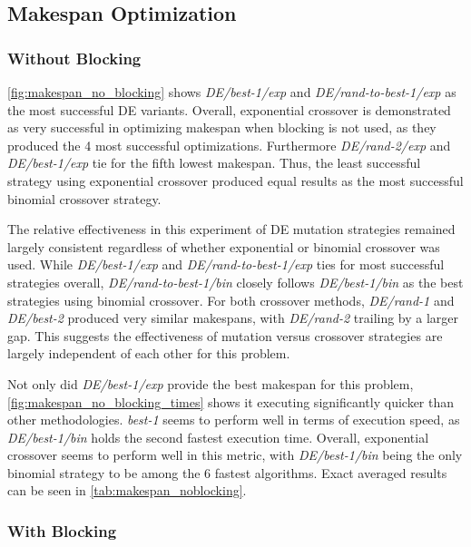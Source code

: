 \documentclass{article}
\begin{document}
\subsection{Makespan Optimization}
\subsubsection{Without Blocking}

\cref{fig:makespan_no_blocking} shows \textit{DE/best-1/exp} and \textit{DE/rand-to-best-1/exp} as the most successful DE variants. Overall, exponential crossover is demonstrated as very successful in optimizing makespan when blocking is not used, as they produced the 4 most successful optimizations. Furthermore \textit{DE/rand-2/exp} and \textit{DE/best-1/exp} tie for the fifth lowest makespan. Thus, the least successful strategy using exponential crossover produced equal results as the most successful binomial crossover strategy. 

The relative effectiveness in this experiment of DE mutation strategies remained largely consistent regardless of whether exponential or binomial crossover was used. While \textit{DE/best-1/exp} and \textit{DE/rand-to-best-1/exp} ties for most successful strategies overall, \textit{DE/rand-to-best-1/bin} closely follows \textit{DE/best-1/bin} as the best strategies using binomial crossover. For both crossover methods, \textit{DE/rand-1} and \textit{DE/best-2} produced very similar makespans, with \textit{DE/rand-2} trailing by a larger gap. This suggests the effectiveness of mutation versus crossover strategies are largely independent of each other for this problem.



Not only did \textit{DE/best-1/exp} provide the best makespan for this problem, \cref{fig:makespan_no_blocking_times} shows it executing significantly quicker than other methodologies. \textit{best-1} seems to perform well in terms of execution speed, as \textit{DE/best-1/bin} holds the second fastest execution time. Overall, exponential crossover seems to perform well in this metric, with \textit{DE/best-1/bin} being the only binomial strategy to be among the 6 fastest algorithms. Exact averaged results can be seen in \cref{tab:makespan_noblocking}.





\subsubsection{With Blocking}
\end{document}
